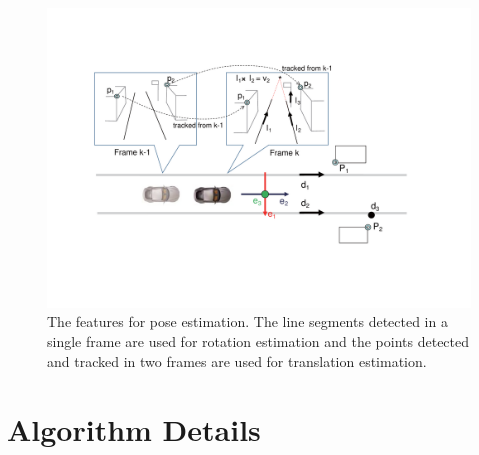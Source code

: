 \documentclass[letterpaper, 10 pt, conference]{ieeeconf}  %
\begin{document}
\begin{figure}
  \centering
  \includegraphics[width=0.9\linewidth]{source//Final//feature.pdf}
  \caption{The features for pose estimation. The line segments detected in a single frame are used for rotation estimation and the points detected and tracked in two frames are used for translation estimation.}
  \label{fig:features_for_estimation}
\end{figure}


\section{Algorithm Details}
\end{document}
